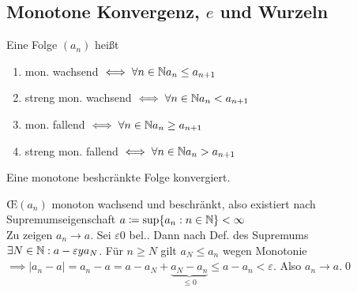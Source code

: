 \documentclass[consecutivenumbering]{gadsescript}
\begin{document}
\subsection{Monotone Konvergenz, $e$ und Wurzeln}
\begin{subdefinition}
	Eine Folge $(a_n)$ heißt
	\begin{enumerate}[label=(\roman*)]
		\item mon. wachsend $\iff \forall n \in \mathbb{N} a_n \leq a_{n+1} $
		\item streng mon. wachsend $\iff \forall n \in \mathbb{N} a_n < a_{n+1} $
		\item mon. fallend  $\iff \forall n \in \mathbb{N} a_n \geq a_{n+1} $
		\item streng mon. fallend $\iff \forall n \in \mathbb{N} a_n > a_{n+1} $
	\end{enumerate}
\end{subdefinition}
\begin{subtheorem}
	Eine monotone beshcränkte Folge konvergiert.
	\begin{subproof*}
		\OE $(a_n)$ monoton wachsend und beschränkt, also existiert nach Supremumseigenschaft $ a \coloneqq \sup\{a_n : n \in \mathbb{N} \} < \infty $\\
		Zu zeigen $ a_n \to a $. Sei $ \varepsilon 0 $ bel.. Dann nach Def. des Supremums $ \exists N \in \mathbb{N} : a - \varepsilon y a_N $. Für $ n \geq N $ gilt $ a_N \leq a_n $ wegen Monotonie $ \implies | a_n - a | = a_n - a = a - a_N + \underbrace{a_N - a_n}_{\leq 0} \leq a - a_n < \varepsilon $. Also $ a_n \to a $.\qed
	\end{subproof*}
\end{subtheorem}
\end{document}
